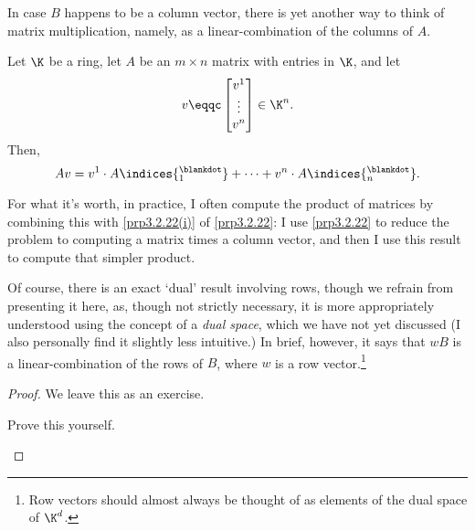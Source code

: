 In case $B$ happens to be a column vector, there is yet another way to think of matrix multiplication, namely, as a linear-combination of the columns of $A$.
\begin{prp}{}{}
	Let $\K$ be a ring, let $A$ be an $m\times n$ matrix with entries in $\K$, and let
	\begin{equation}
		v\eqqc \begin{bmatrix}v^1 \\ \vdots \\ v^n\end{bmatrix}\in \K ^n.
	\end{equation}
	Then,
	\begin{equation}\label{eqn3.2.30}
		Av=v^1\cdot A\indices{^{\blankdot}_1}+\cdots +v^n\cdot A\indices{^{\blankdot}_n}.
	\end{equation}
	\begin{rmk}
		For what it's worth, in practice, I often compute the product of matrices by combining this with \cref{prp3.2.22(i)} of \cref{prp3.2.22}:  I use \cref{prp3.2.22} to reduce the problem to computing a matrix times a column vector, and then I use this result to compute that simpler product.
	\end{rmk}
	\begin{rmk}
		Of course, there is an exact `dual' result involving rows, though we refrain from presenting it here, as, though not strictly necessary, it is more appropriately understood using the concept of a \emph{dual space}, which we have not yet discussed  (I also personally find it slightly less intuitive.)  In brief, however, it says that $wB$ is a linear-combination of the rows of $B$, where $w$ is a row vector.\footnote{Row vectors should almost always be thought of as elements of the dual space of $\K ^d$.}
	\end{rmk}
	\begin{proof}
		We leave this as an exercise.
		\begin{exr}[breakable=false]{}{}
			Prove this yourself.
		\end{exr}
	\end{proof}
\end{prp}


